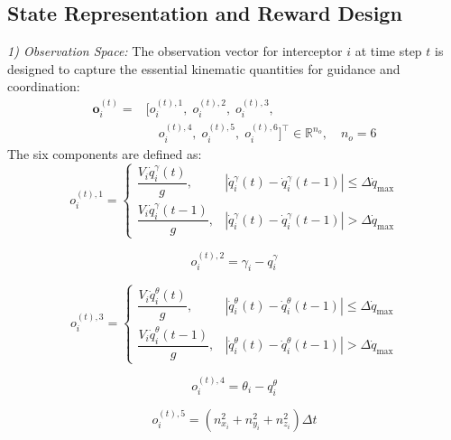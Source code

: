 \documentclass[lettersize,journal]{IEEEtran}
\begin{document}
\subsection{State Representation and Reward Design}
\label{subsec:state_reward}

\emph{1) Observation Space:} The observation vector for interceptor $i$ at time step $t$ is designed to capture the essential kinematic quantities for guidance and coordination:
\begin{equation}
\label{eq:observation_space}
\begin{aligned}
\mathbf{o}_i^{(t)}={}&\bigl[o_i^{(t),1},\;o_i^{(t),2},\;o_i^{(t),3},\\[-2pt]
&\quad o_i^{(t),4},\;o_i^{(t),5},\;o_i^{(t),6}\bigr]^\top\in\mathbb{R}^{n_o},\quad n_o=6
\end{aligned}
\end{equation}
The six components are defined as:
\begin{equation}
\label{eq:o1}
o_i^{(t),1} =
\begin{cases}
\dfrac{V_i \dot{q}_i^{\gamma}(t)}{g}, &
\left|\dot{q}_i^{\gamma}(t) - \dot{q}_i^{\gamma}(t-1)\right|
\leq \Delta \dot{q}_{\max}
\\[0pt]
\dfrac{V_i \dot{q}_i^{\gamma}(t-1)}{g}, &
\left|\dot{q}_i^{\gamma}(t) - \dot{q}_i^{\gamma}(t-1)\right|
> \Delta \dot{q}_{\max}
\end{cases}
\end{equation}

\begin{equation}
\label{eq:o2}
o_i^{(t),2} = \gamma_i-q_i^{\gamma}
\end{equation}

\begin{equation}
\label{eq:o3}
o_i^{(t),3} =
\begin{cases}
\dfrac{V_i \dot{q}_i^{\theta}(t)}{g}, &
\left|\dot{q}_i^{\theta}(t) - \dot{q}_i^{\theta}(t-1)\right|
\leq \Delta \dot{q}_{\max}
\\[0pt]
\dfrac{V_i \dot{q}_i^{\theta}(t-1)}{g}, &
\left|\dot{q}_i^{\theta}(t) - \dot{q}_i^{\theta}(t-1)\right|
> \Delta \dot{q}_{\max}
\end{cases}
\end{equation}

\begin{equation}
\label{eq:o4}
o_i^{(t),4} = \theta_i-q_i^{\theta}
\end{equation}

\begin{equation}
\label{eq:o5}
o_i^{(t),5}
=
\left(n_{x_i}^2+n_{y_i}^2+n_{z_i}^2\right)\Delta t
\end{equation}
\end{document}
